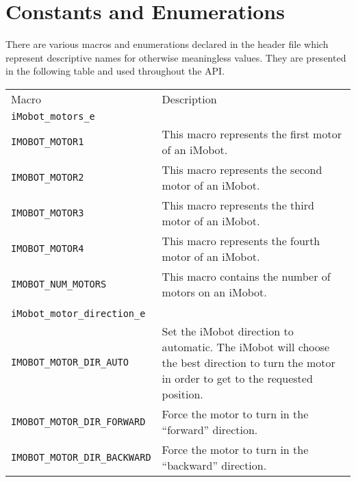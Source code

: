 \section{Constants and Enumerations}
There are various macros and enumerations declared in the header file which 
represent descriptive names for otherwise meaningless values. They are 
presented in the following table and used throughout the API.

\begin{tabular}{lp{3.7in}}
Macro & Description \\
\texttt{iMobot\_motors\_e} & \\\hline
\texttt{IMOBOT\_MOTOR1} & This macro represents the first motor of an iMobot. \\
\texttt{IMOBOT\_MOTOR2} & This macro represents the second motor of an iMobot. \\
\texttt{IMOBOT\_MOTOR3} & This macro represents the third motor of an iMobot. \\
\texttt{IMOBOT\_MOTOR4} & This macro represents the fourth motor of an iMobot. \\
\texttt{IMOBOT\_NUM\_MOTORS} & This macro contains the number of motors on an iMobot. \\
 & \\
\texttt{iMobot\_motor\_direction\_e} & \\\hline
\texttt{IMOBOT\_MOTOR\_DIR\_AUTO} & Set the iMobot direction to automatic. The iMobot will choose the best direction to turn the motor in order to get to the requested position. \\
\texttt{IMOBOT\_MOTOR\_DIR\_FORWARD} & Force the motor to turn in the ``forward'' direction. \\
\texttt{IMOBOT\_MOTOR\_DIR\_BACKWARD} & Force the motor to turn in the ``backward'' direction.
\end{tabular}

\newpage

\pagebreak

\pagebreak

\pagebreak

\pagebreak

\pagebreak

\pagebreak

\pagebreak

\pagebreak

\pagebreak

\pagebreak

\pagebreak

\pagebreak

\pagebreak

\pagebreak

